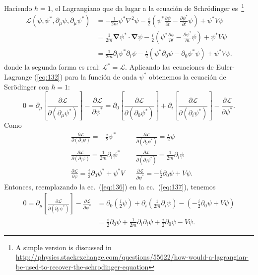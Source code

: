 Haciendo $\hbar=1$, el Lagrangiano que da lugar a la ecuaci\'on de Schr\"odinger es~\cite{0712.1608}\footnote{A simple version is discussed in 
\url{http://physics.stackexchange.com/questions/55622/how-would-a-lagrangian-be-used-to-recover-the-schrodinger-equation}}
\begin{align}
\label{eq:5tcc}
  \mathcal{L}(\psi,\psi^*,\partial_\mu\psi,\partial_\mu\psi^*)
  &=-\frac{1}{2m}\psi^*\nabla^2\psi-\frac{i}{2}
  \left(
\psi^*\frac{\partial\psi}{\partial t}-\frac{\partial\psi^*}{\partial t}\psi
  \right)+\psi^*V\psi\\
&=\frac{1}{2m}\boldsymbol{\nabla}\psi^*\cdot\boldsymbol{\nabla}\psi-\frac{i}{2}
  \left(
\psi^*\frac{\partial\psi}{\partial t}-\frac{\partial\psi^*}{\partial t}\psi
  \right)+\psi^*V\psi\\
&=\frac{1}{2m}\partial_i\psi^*\partial_i\psi-\frac{i}{2}
  \left(\psi^*\partial_0\psi-\partial_0\psi^*\psi\right)+\psi^*V\psi.\nonumber
\end{align}
donde la segunda forma es real: $\mathcal{L}^*=\mathcal{L}$. Aplicando las ecuaciones de Euler-Lagrange (\ref{eq:132}) para
la funci\'on de onda $\psi^*$ obtenemos la ecuaci\'on de Scr\"odinger con $\hbar=1$:
\begin{equation}
  \label{eq:137}
    0=\partial_\mu\left[\frac{\partial\mathcal{L}}{\partial(\partial_\mu\psi^*)}\right]-\frac{\partial\mathcal{L}}{\partial\psi^*}=
  \partial_0\left[\frac{\partial\mathcal{L}}{\partial(\partial_0\psi^*)}\right]+  
\partial_i\left[\frac{\partial\mathcal{L}}{\partial(\partial_i\psi^*)}\right]-\frac{\partial\mathcal{L}}{\partial\psi^*}.
\end{equation}
Como
\begin{align}
  \label{eq:136}
  &\frac{\partial\mathcal{L}}{\partial(\partial_0\psi)}=-\frac{i}{2}\psi^*&&\frac{\partial\mathcal{L}}{\partial(\partial_0\psi^*)}=\frac{i}{2}\psi\nonumber\\
  &\frac{\partial\mathcal{L}}{\partial(\partial_i\psi)}=\frac{1}{2m}\partial_i\psi^*&&\frac{\partial\mathcal{L}}{\partial(\partial_i\psi^*)}=\frac{1}{2m}\partial_i\psi\\
  &\frac{\partial\mathcal{L}}{\partial\psi}=\frac{i}{2}\partial_0\psi^*+\psi^*V&&\frac{\partial\mathcal{L}}{\partial\psi^*}=-\frac{i}{2}\partial_0\psi+V\psi.\nonumber
\end{align}
Entonces, reemplazando la ec.~(\ref{eq:136}) en la ec.~(\ref{eq:137}), tenemos
\begin{align}
 0=\partial_\mu\left[\frac{\partial\mathcal{L}}{\partial(\partial_\mu\psi^*)}\right]-\frac{\partial\mathcal{L}}{\partial\psi^*}
 &=\partial_0\left(\frac{i}{2}\psi\right)+\partial_i\left(\frac{1}{2m}\partial_i\psi\right)
  -\left(-\frac{i}{2}\partial_0\psi+V\psi\right)\nonumber\\
  &=\frac{i}{2}\partial_0\psi+\frac{1}{2m}\partial_i\partial_i\psi+\frac{i}{2}\partial_0\psi-V\psi.
\end{align}

